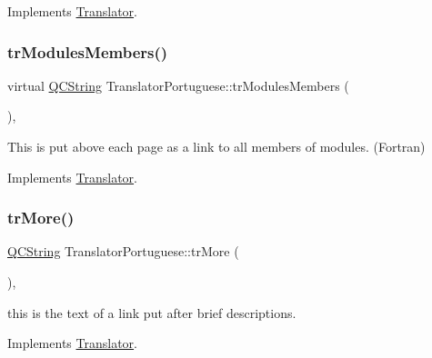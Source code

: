 Implements \mbox{\hyperlink{class_translator}{Translator}}.

\mbox{\label{class_translator_portuguese_a54e355b689dd1ac2bb193bbda4f1bd8e}} 
\subsubsection{\texorpdfstring{trModulesMembers()}{trModulesMembers()}}
{\footnotesize\ttfamily virtual \mbox{\hyperlink{class_q_c_string}{Q\+C\+String}} Translator\+Portuguese\+::tr\+Modules\+Members (\begin{DoxyParamCaption}{ }\end{DoxyParamCaption})\hspace{0.3cm}{\ttfamily [inline]}, {\ttfamily [virtual]}}

This is put above each page as a link to all members of modules. (Fortran) 

Implements \mbox{\hyperlink{class_translator}{Translator}}.

\mbox{\label{class_translator_portuguese_ac5f0e7715631eb9c7b02d7c2114c4a37}} 
\subsubsection{\texorpdfstring{trMore()}{trMore()}}
{\footnotesize\ttfamily \mbox{\hyperlink{class_q_c_string}{Q\+C\+String}} Translator\+Portuguese\+::tr\+More (\begin{DoxyParamCaption}{ }\end{DoxyParamCaption})\hspace{0.3cm}{\ttfamily [inline]}, {\ttfamily [virtual]}}

this is the text of a link put after brief descriptions. 

Implements \mbox{\hyperlink{class_translator}{Translator}}.

\mbox{\label{class_translator_portuguese_a9d758c550ae9d5fa29d79badcd0dab5b}} 
